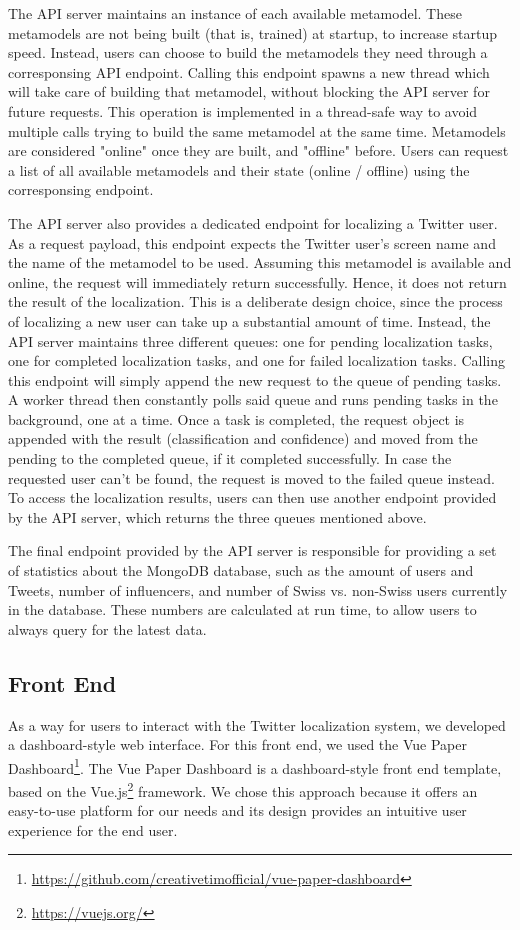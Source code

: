 \documentclass[10pt,a4paper]{article}
\begin{document}
The API server maintains an instance of each available metamodel. These metamodels are not being built (that is, trained) at startup, to increase startup speed. Instead, users can choose to build the metamodels they need through a corresponsing API endpoint. Calling this endpoint spawns a new thread which will take care of building that metamodel, without blocking the API server for future requests. This operation is implemented in a thread-safe way to avoid multiple calls trying to build the same metamodel at the same time. Metamodels are considered "online" once they are built, and "offline" before. Users can request a list of all available metamodels and their state (online / offline) using the corresponsing endpoint.

The API server also provides a dedicated endpoint for localizing a Twitter user. As a request payload, this endpoint expects the Twitter user's screen name and the name of the metamodel to be used. Assuming this metamodel is available and online, the request will immediately return successfully. Hence, it does not return the result of the localization. This is a deliberate design choice, since the process of localizing a new user can take up a substantial amount of time. Instead, the API server maintains three different queues: one for pending localization tasks, one for completed localization tasks, and one for failed localization tasks. Calling this endpoint will simply append the new request to the queue of pending tasks. A worker thread then constantly polls said queue and runs pending tasks in the background, one at a time. Once a task is completed, the request object is appended with the result (classification and confidence) and moved from the pending to the completed queue, if it completed successfully. In case the requested user can't be found, the request is moved to the failed queue instead. To access the localization results, users can then use another endpoint provided by the API server, which returns the three queues mentioned above.

The final endpoint provided by the API server is responsible for providing a set of statistics about the MongoDB database, such as the amount of users and Tweets, number of influencers, and number of Swiss vs. non-Swiss users currently in the database. These numbers are calculated at run time, to allow users to always query for the latest data. 

\subsection{Front End}
As a way for users to interact with the Twitter localization system, we developed a dashboard-style web interface. For this front end, we used the Vue Paper Dashboard\footnote{\href{https://github.com/creativetimofficial/vue-paper-dashboard}{https://github.com/creativetimofficial/vue-paper-dashboard}}. The Vue Paper Dashboard is a dashboard-style front end template, based on the Vue.js\footnote{\href{https://vuejs.org/}{https://vuejs.org/}} framework. We chose this approach because it offers an easy-to-use platform for our needs and its design provides an intuitive user experience for the end user.
\end{document}
